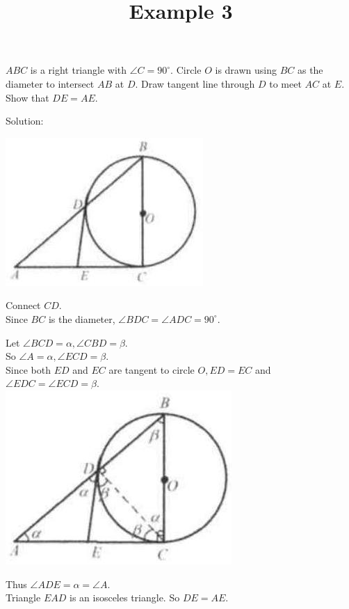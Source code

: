 \documentclass{article}
\title{Example 3}
\date{}
\begin{document}
\maketitle

\(A B C\) is a right triangle with \(\angle C=90^{\circ}\). Circle \(O\) is drawn using \(B C\) as the diameter to intersect \(A B\) at \(D\). Draw tangent line through \(D\) to meet \(A C\) at \(E\). Show that \(D E=A E\).

Solution:
\begin{center}
\includegraphics[width=\textwidth]{images/problem_image_1.jpg}
\end{center}

Connect \(C D\).\\
Since \(B C\) is the diameter, \(\angle B D C=\angle A D C=90^{\circ}\).


Let \(\angle B C D=\alpha, \angle C B D=\beta\).\\
So \(\angle A=\alpha, \angle E C D=\beta\).\\
Since both \(E D\) and \(E C\) are tangent to circle \(O, E D=E C\) and \(\angle E D C=\angle E C D=\beta\).\\
\centering
\includegraphics[width=\textwidth]{images/reasoning_image_1.jpg}

Thus \(\angle A D E=\alpha=\angle A\).\\
Triangle \(E A D\) is an isosceles triangle. So \(D E=A E\).\\
\end{document}
